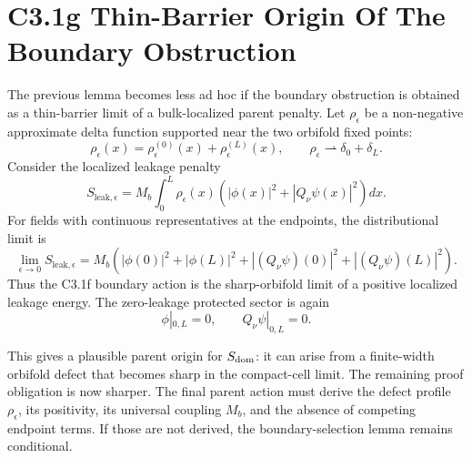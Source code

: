 \documentclass[11pt]{article}
\begin{document}
\section{C3.1g Thin-Barrier Origin Of The Boundary Obstruction}
The previous lemma becomes less ad hoc if the boundary obstruction is obtained
as a thin-barrier limit of a bulk-localized parent penalty.  Let $\rho_\epsilon$
be a non-negative approximate delta function supported near the two orbifold
fixed points:
\begin{equation}
\rho_\epsilon(x)
=\rho_\epsilon^{(0)}(x)+\rho_\epsilon^{(L)}(x),
\qquad
\rho_\epsilon\rightharpoonup \delta_0+\delta_L .
\end{equation}
Consider the localized leakage penalty
\begin{equation}
S_{\mathrm{leak},\epsilon}
=M_b\int_0^L\rho_\epsilon(x)
\left(|\phi(x)|^2+|Q_\nu\psi(x)|^2\right)dx .
\end{equation}
For fields with continuous representatives at the endpoints, the distributional
limit is
\begin{equation}
\lim_{\epsilon\to0}S_{\mathrm{leak},\epsilon}
=M_b\left(|\phi(0)|^2+|\phi(L)|^2
+|(Q_\nu\psi)(0)|^2+|(Q_\nu\psi)(L)|^2\right).
\end{equation}
Thus the C3.1f boundary action is the sharp-orbifold limit of a positive
localized leakage energy.  The zero-leakage protected sector is again
\begin{equation}
\phi|_{0,L}=0,
\qquad
Q_\nu\psi|_{0,L}=0 .
\end{equation}

This gives a plausible parent origin for $S_{\rm dom}$: it can arise from a
finite-width orbifold defect that becomes sharp in the compact-cell limit.  The
remaining proof obligation is now sharper.  The final parent action must derive
the defect profile $\rho_\epsilon$, its positivity, its universal coupling
$M_b$, and the absence of competing endpoint terms.  If those are not derived,
the boundary-selection lemma remains conditional.
\end{document}
